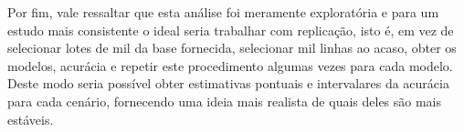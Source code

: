 \documentclass[
	12pt,				%
	openright,			%
	twoside,			%
	a4paper,			%
	english,			%
	brazil,				%
	svgnames
	]{abntex2}\usepackage[]{graphicx}\usepackage[]{color}
\begin{document}
Por fim, vale ressaltar que esta análise foi meramente exploratória e para um estudo mais consistente o ideal seria trabalhar com replicação, isto é, em vez de selecionar lotes de mil da base fornecida, selecionar mil linhas ao acaso, obter os modelos, acurácia e repetir este procedimento algumas vezes para cada modelo. Deste modo seria possível obter estimativas pontuais e intervalares da acurácia para cada cenário, fornecendo uma ideia mais realista de quais deles são mais estáveis.



\postextual




% 








\end{document}
